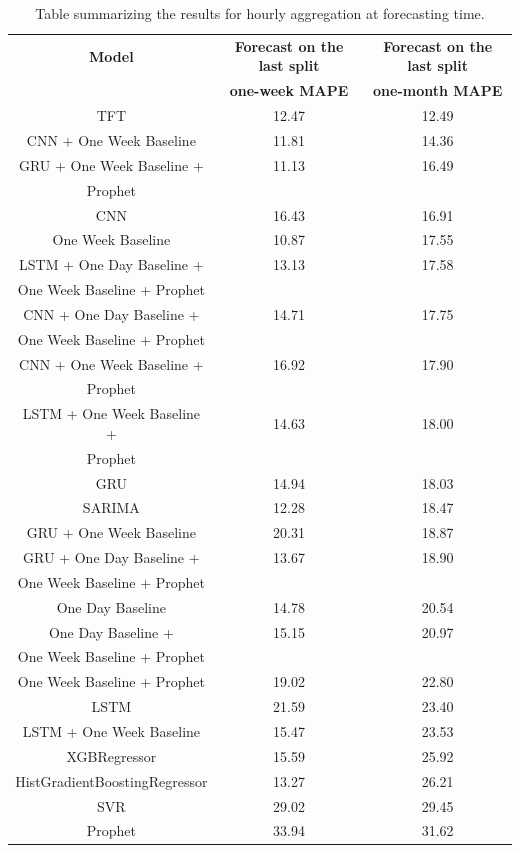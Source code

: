 \begin{table}[H]
\centering
\begin{tabular}{|c|c|c|}
\hline
\textbf{Model} & \textbf{Forecast on the last split} & \textbf{Forecast on the last split}\\
 & \textbf{one-week MAPE} & \textbf{one-month MAPE}\\
\hline
TFT & 12.47 & 12.49\\
\hline
CNN + One Week Baseline & 11.81 & 14.36\\
\hline
GRU + One Week Baseline + & 11.13 & 16.49\\
Prophet & & \\
\hline
CNN & 16.43 & 16.91\\
\hline
One Week Baseline & 10.87 & 17.55\\
\hline
LSTM + One Day Baseline + & 13.13 & 17.58\\
One Week Baseline + Prophet & & \\
\hline
CNN + One Day Baseline + & 14.71 & 17.75\\
One Week Baseline + Prophet & & \\
\hline
CNN + One Week Baseline + & 16.92 & 17.90\\
Prophet & & \\
\hline
LSTM + One Week Baseline + & 14.63 & 18.00\\
Prophet & & \\
\hline
GRU & 14.94 & 18.03\\
\hline
SARIMA & 12.28 & 18.47\\
\hline
GRU + One Week Baseline & 20.31 & 18.87\\
\hline
GRU + One Day Baseline + & 13.67 & 18.90\\
One Week Baseline + Prophet & & \\
\hline
One Day Baseline & 14.78 & 20.54\\
\hline
One Day Baseline + & 15.15 & 20.97\\
One Week Baseline + Prophet & & \\
\hline
One Week Baseline + Prophet & 19.02 & 22.80\\
\hline
LSTM & 21.59 & 23.40\\
\hline
LSTM + One Week Baseline & 15.47 & 23.53\\
\hline
XGBRegressor & 15.59 & 25.92\\
\hline
HistGradientBoostingRegressor & 13.27 & 26.21\\
\hline
SVR & 29.02 & 29.45\\
\hline
Prophet & 33.94 & 31.62\\
\hline
\end{tabular}
\caption{Table summarizing the results for hourly aggregation at forecasting time.}
\label{tab:demandhourlyresultsforecast}
\end{table}

